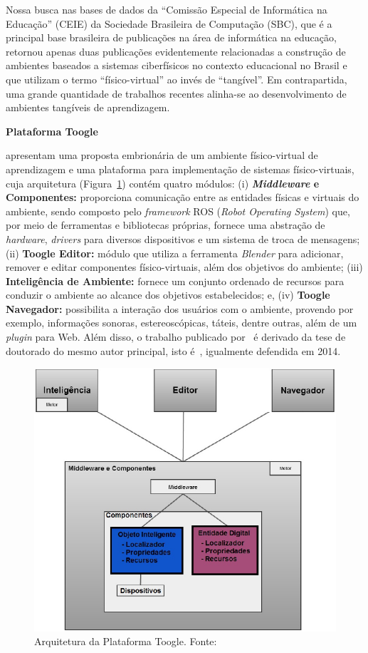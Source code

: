 Nossa busca nas bases de dados da ``Comissão Especial de Informática na Educação'' (CEIE) da Sociedade Brasileira de Computação (SBC), que é a principal base brasileira de publicações na área de informática na educação, retornou apenas duas publicações evidentemente relacionadas a construção de ambientes baseados a sistemas ciberfísicos no contexto educacional no Brasil e que utilizam o termo ``físico-virtual'' ao invés de ``tangível''. Em contrapartida, uma grande quantidade de trabalhos recentes alinha-se ao desenvolvimento de ambientes tangíveis de aprendizagem.

\textbf{Plataforma Toogle}

\cite{Santos:2014} apresentam uma proposta embrionária de um ambiente físico-virtual de aprendizagem e uma plataforma para implementação de sistemas físico-virtuais, cuja arquitetura (Figura~\ref{fig:santos2014plataforma}) contém quatro módulos: (i) \textbf{\textit{Middleware} e Componentes:} proporciona comunicação entre as entidades físicas e virtuais do ambiente, sendo composto pelo \textit{framework} ROS (\textit{Robot Operating System}) que, por meio de ferramentas e bibliotecas próprias, fornece uma abstração de \textit{hardware}, \textit{drivers} para diversos dispositivos e um sistema de troca de mensagens; (ii) \textbf{Toogle Editor:} módulo que utiliza a ferramenta \textit{Blender} para adicionar, remover e editar componentes físico-virtuais, além dos objetivos do ambiente; (iii) \textbf{Inteligência de Ambiente:} fornece um conjunto ordenado de recursos para conduzir o ambiente ao alcance dos objetivos estabelecidos; e, (iv) \textbf{Toogle Navegador:} possibilita a interação dos usuários com o ambiente, provendo por exemplo, informações sonoras, estereoscópicas, táteis, dentre outras, além de um \textit{plugin} para Web. 
Além disso, o trabalho publicado por~\cite{Santos:2014} é derivado da tese de doutorado do mesmo autor principal, isto é~\cite{santos:2014ambientes}, igualmente defendida em 2014. 

\begin{figure}[htb]
	\centering
	\includegraphics[width=0.8\linewidth]{chapters/works/santos2014_arquitetura.png}
	\caption{Arquitetura da Plataforma Toogle. Fonte:~\cite{Santos:2014}}
	\label{fig:santos2014plataforma}
\end{figure}

